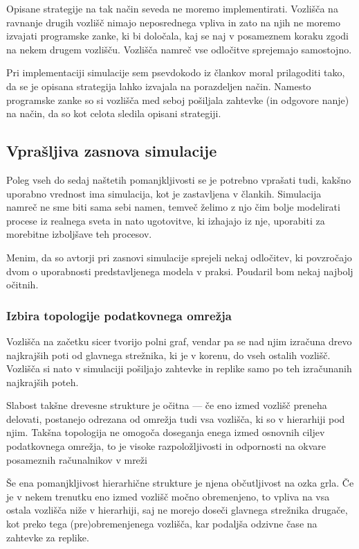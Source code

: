 \documentclass[a4paper, 12pt]{book}
\begin{document}
Opisane strategije na tak način seveda ne moremo implementirati. Vozlišča na
ravnanje drugih vozlišč nimajo neposrednega vpliva in zato na njih ne moremo
izvajati programske zanke, ki bi določala, kaj se naj v posameznem koraku zgodi
na nekem drugem vozlišču. Vozlišča namreč vse odločitve sprejemajo samostojno.

Pri implementaciji simulacije sem psevdokodo iz člankov moral prilagoditi tako,
da se je opisana strategija lahko izvajala na porazdeljen način. Namesto
programske zanke so si vozlišča med seboj pošiljala zahtevke (in odgovore
nanje) na način, da so kot celota sledila opisani strategiji.


\subsection{Vprašljiva zasnova simulacije}

Poleg vseh do sedaj naštetih pomanjkljivosti se je potrebno vprašati tudi,
kakšno uporabno vrednost ima simulacija, kot je zastavljena v člankih.
Simulacija namreč ne sme biti sama sebi namen, temveč želimo z njo čim bolje
modelirati procese iz realnega sveta in nato ugotovitve, ki izhajajo iz nje,
uporabiti za morebitne izboljšave teh procesov.

Menim, da so avtorji pri zasnovi simulacije sprejeli nekaj odločitev, ki
povzročajo dvom o uporabnosti predstavljenega modela v praksi. Poudaril
bom nekaj najbolj očitnih.

\subsubsection{Izbira topologije podatkovnega omrežja}

Vozlišča na začetku sicer tvorijo polni graf, vendar pa se nad njim izračuna
drevo najkrajših poti od glavnega strežnika, ki je v korenu, do vseh ostalih
vozlišč. Vozlišča si nato v simulaciji pošiljajo zahtevke in replike samo po
teh izračunanih najkrajših poteh.

Slabost takšne drevesne strukture je očitna --- če eno izmed vozlišč
preneha delovati, postanejo odrezana od omrežja tudi vsa vozlišča, ki so v
hierarhiji pod njim. Takšna topologija ne omogoča doseganja enega izmed
osnovnih ciljev podatkovnega omrežja, to je visoke razpoložljivosti in
odpornosti na okvare posameznih računalnikov v mreži

Še ena pomanjkljivost hierarhične strukture je njena občutljivost na ozka grla.
Če je v nekem trenutku eno izmed vozlišč močno obremenjeno, to vpliva na vsa
ostala vozlišča niže v hierarhiji, saj ne morejo doseči glavnega strežnika
drugače, kot preko tega (pre)obremenjenega vozlišča, kar podaljša odzivne
čase na zahtevke za replike.
\end{document}
